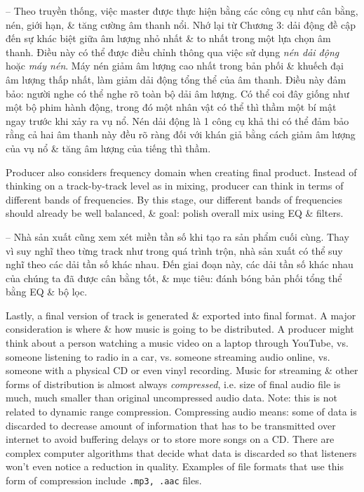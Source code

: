 \documentclass{article}
\begin{document}
\begin{itemize}
\begin{itemize}
		-- Theo truyền thống, việc master được thực hiện bằng các công cụ như cân bằng, nén, giới hạn, \& tăng cường âm thanh nổi. Nhớ lại từ Chương 3: dải động đề cập đến sự khác biệt giữa âm lượng nhỏ nhất \& to nhất trong một lựa chọn âm thanh. Điều này có thể được điều chỉnh thông qua việc sử dụng {\it nén dải động} hoặc {\it máy nén}. Máy nén giảm âm lượng cao nhất trong bản phối \& khuếch đại âm lượng thấp nhất, làm giảm dải động tổng thể của âm thanh. Điều này đảm bảo: người nghe có thể nghe rõ toàn bộ dải âm lượng. Có thể coi đây giống như một bộ phim hành động, trong đó một nhân vật có thể thì thầm một bí mật ngay trước khi xảy ra vụ nổ. Nén dải động là 1 công cụ khả thi có thể đảm bảo rằng cả hai âm thanh này đều rõ ràng đối với khán giả bằng cách giảm âm lượng của vụ nổ \& tăng âm lượng của tiếng thì thầm.
		
		Producer also considers frequency domain when creating final product. Instead of thinking on a track-by-track level as in mixing, producer can think in terms of different bands of frequencies. By this stage, our different bands of frequencies should already be well balanced, \& goal: polish overall mix using EQ \& filters.
		
		-- Nhà sản xuất cũng xem xét miền tần số khi tạo ra sản phẩm cuối cùng. Thay vì suy nghĩ theo từng track như trong quá trình trộn, nhà sản xuất có thể suy nghĩ theo các dải tần số khác nhau. Đến giai đoạn này, các dải tần số khác nhau của chúng ta đã được cân bằng tốt, \& mục tiêu: đánh bóng bản phối tổng thể bằng EQ \& bộ lọc.
		
		Lastly, a final version of track is generated \& exported into final format. A major consideration is where \& how music is going to be distributed. A producer might think about a person watching a music video on a laptop through YouTube, vs. someone listening to radio in a car, vs. someone streaming audio online, vs. someone with a physical CD or even vinyl recording. Music for streaming \& other forms of distribution is almost always {\it compressed}, i.e. size of final audio file is much, much smaller than original uncompressed audio data. Note: this is not related to dynamic range compression. Compressing audio means: some of data is discarded to decrease amount of information that has to be transmitted over internet to avoid buffering delays or to store more songs on a CD. There are complex computer algorithms that decide what data is discarded so that listeners won't even notice a reduction in quality. Examples of file formats that use this form of compression include {\tt.mp3, .aac} files.
		

\end{itemize}
\end{itemize}
\end{document}
